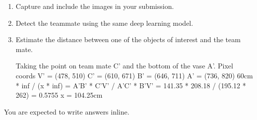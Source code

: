 \begin{enumerate}
\item Capture and include the images in your submission.
\item Detect the teammate using the same deep learning model.
\item Estimate the distance between one of the objects of interest and
  the team mate.
\begin{studentSpace}
    \vspace{5cm}
    Taking the point on team mate C' and the bottom of the vase A'.
    Pixel coords
    V' = (478, 510)
    C' = (610, 671)
    B' = (646, 711)
    A' = (736, 820)
    60cm * inf / (x * inf) = A'B' * C'V' / A'C' * B'V' = 141.35 * 208.18 / (195.12 * 262) = 0.5755
    x = 104.25cm
\end{studentSpace}
\end{enumerate}

You are expected to write answers inline.

